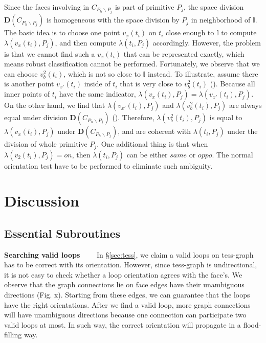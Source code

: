 \documentclass[10pt,journal,compsoc]{IEEEtran}
\begin{document}
Since the faces involving in $C_{P_h \backslash P_j}$ is part of primitive $P_j$, the space division $\boldsymbol{D}(C_{P_h \backslash P_j})$ is homogeneous with the space division by $P_j$ in neighborhood of $\mathbb{I}$. The basic idea is to choose one point $v_x(t_i)$ on $t_i$ close enough to $\mathbb{I}$ to compute $\lambda(v_x(t_i), P_j)$, and then compute $\lambda(t_i, P_j)$ accordingly. However, the problem is that we cannot find such a $v_x(t_i)$ that can be represented exactly, which means robust classification cannot be performed. Fortunately, we observe that we can choose $v_b^2(t_i)$, which is not so close to $\mathbb{I}$ instead. To illustrate, assume there is another point $v_{x'}(t_i)$ inside of $t_i$ that is very close to $v_b^2(t_i)$ ({\color{red}{Fig. x}}). Because all inner points of $t_i$ have the same indicator, $\lambda(v_x(t_i), P_j) = \lambda(v_{x'}(t_i), P_j)$. On the other hand, we find that $\lambda(v_{x'}(t_i), P_j)$ and $\lambda(v_b^2(t_i), P_j)$ are always equal under division $\boldsymbol{D}(C_{P_h \backslash P_j})$ ({}). Therefore, $\lambda(v_b^2(t_i), P_j)$ is equal to $\lambda(v_x(t_i), P_j)$ under $\boldsymbol{D}(C_{P_h \backslash P_j})$, and are coherent with $\lambda(t_i, P_j)$ under the division of whole primitive $P_j$. One additional thing is that when $\lambda(v_2(t_i), P_j)=on$, then $\lambda(t_i, P_j)$ can be either $same$ or $oppo$. The normal orientation test have to be performed to eliminate such ambiguity.

\fi

\section{Discussion}

\vspace{0.5em}

\subsection{Essential Subroutines}
\label{sec:esubroutine}

\vspace{0.5em}
\noindent\textbf{Searching valid loops}~~~~ In \S\ref{sec:tess}, we claim a valid loops on tess-graph has to be correct with its orientation. However, since tess-graph is undirectional, it is not easy to check whether a loop orientation agrees with the face's. We observe that the graph connections lie on face edges have their unambiguous directions (Fig. x). Starting from these edges, we can guarantee that the loops have the right orientations. After we find a valid loop, more graph connections will have unambiguous directions because one connection can participate two valid loops at most. In such way, the correct orientation will propagate in a flood-filling way.
\end{document}
